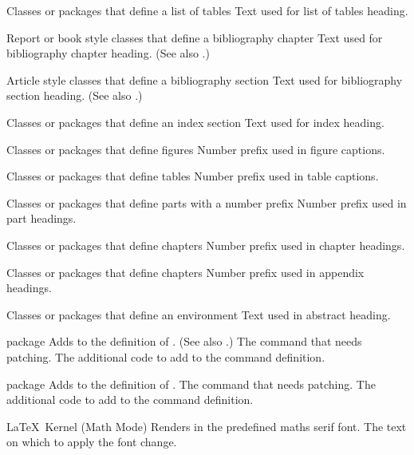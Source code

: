 %
 {}%
 {Classes or packages that define a list of tables}%
 {Text used for list of tables heading.}%
 {}

%
 {}%
 {Report or book style classes that define a bibliography chapter}%
 {Text used for bibliography chapter heading. (See also
  .)}%
 {}

%
 {}%
 {Article style classes that define a bibliography section}%
 {Text used for bibliography section heading. (See also
   .)}%
 {}

%
 {}%
 {Classes or packages that define an index section}%
 {Text used for index heading.}%
 {}

%
 {}%
 {Classes or packages that define figures}%
 {Number prefix used in figure captions.}%
 {}

%
 {}%
 {Classes or packages that define tables}%
 {Number prefix used in table captions.}%
 {}

%
 {}%
 {Classes or packages that define parts with a number prefix}%
 {Number prefix used in part headings.}%
 {}

%
 {}%
 {Classes or packages that define chapters}%
 {Number prefix used in chapter headings.}%
 {}

%
 {}%
 {Classes or packages that define chapters}%
 {Number prefix used in appendix headings.}%
 {}

%
 {}%
 {Classes or packages that define an 
  environment}%
 {Text used in abstract heading.}%
 {}

%
 {}
 { package}
 {Adds  to the definition of . (See also .)}
 {%
   \BeginArgList
      The command that needs patching.
      The additional code to add to the command
definition.
   \EndArgList
 }

%
 {}
 { package}
 {Adds  to the definition of .}
 {%
   \BeginArgList
      The command that needs patching.
      The additional code to add to the command definition.
   \EndArgList
 }

%
 {}%
 {\LaTeX\ Kernel (Math Mode)}%
 {Renders  in the predefined maths serif font.}%
 {%
   \BeginArgList
      The text on which to apply the font change.
   \EndArgList
 }


